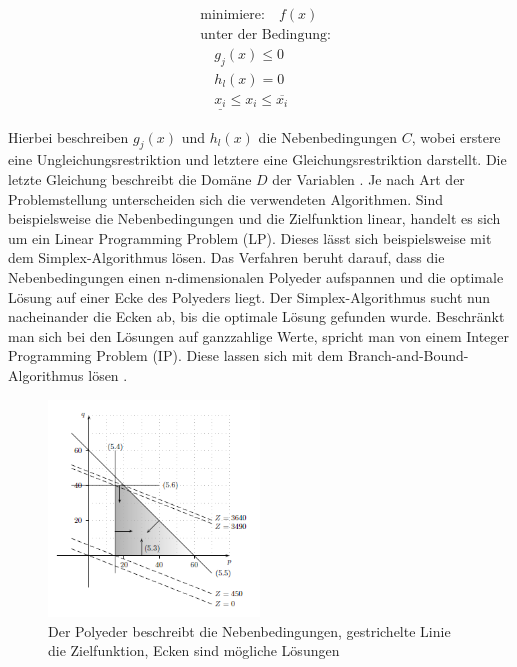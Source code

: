 \[
\begin{aligned}
    &\text{minimiere:} \quad f(x) \\
    &\text{unter der Bedingung:} \\
    &\quad g_j(x) \leq 0 \\
    &\quad h_l(x) = 0 \\
    &\quad \underline{x_i} \leq x_i \leq \overline{x_i}
\end{aligned}
\]

Hierbei beschreiben \(g_j(x)\) und \(h_l(x)\) die Nebenbedingungen \(C\), wobei
erstere eine Ungleichungsrestriktion und letztere eine Gleichungsrestriktion
darstellt. Die letzte Gleichung beschreibt die Domäne \(D\) der Variablen
\cite[154]{marti21bo}. Je nach Art der Problemstellung unterscheiden sich die
verwendeten Algorithmen. Sind beispielsweise die Nebenbedingungen und die
Zielfunktion linear, handelt es sich um ein Linear Programming Problem (LP).
Dieses lässt sich beispielsweise mit dem Simplex-Algorithmus lösen. Das
Verfahren beruht darauf, dass die Nebenbedingungen einen n-dimensionalen
Polyeder aufspannen und die optimale Lösung auf einer Ecke des Polyeders liegt.
Der Simplex-Algorithmus sucht nun nacheinander die Ecken ab, bis die optimale
Lösung gefunden wurde. Beschränkt man sich bei den Lösungen auf ganzzahlige
Werte, spricht man von einem Integer Programming Problem (IP). Diese lassen sich
mit dem Branch-and-Bound-Algorithmus lösen \cite{dakin65jo}
\cite[99]{hofst07bo}.

\begin{figure}[h]
    \centering
    \includegraphics[width=0.5\textwidth]{figures/Simplex.PNG}
    \caption{Der Polyeder beschreibt die Nebenbedingungen, gestrichelte Linie
    die Zielfunktion, Ecken sind mögliche Lösungen \cite[100]{hofst07bo}}
    \label{fig:bild}
\end{figure}

